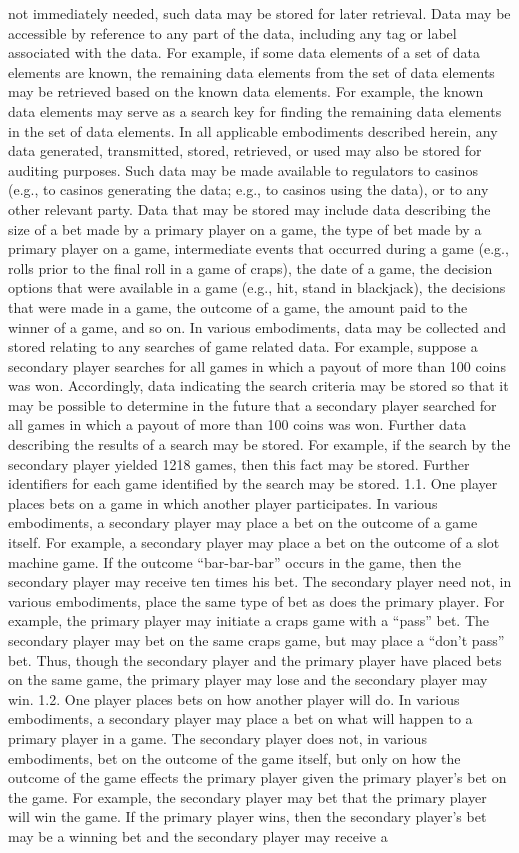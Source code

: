 \documentclass[11pt,a4paper]{article}
\begin{document}
not immediately needed, such data may be stored for later retrieval. Data may be accessible by reference to any part of the data, including any tag or label associated with the data. For example, if some data elements of a set of data elements are known, the remaining data elements from the set of data elements may be retrieved based on the known data elements. For example, the known data elements may serve as a search key for finding the remaining data elements in the set of data elements. In all applicable embodiments described herein, any data generated, transmitted, stored, retrieved, or used may also be stored for auditing purposes. Such data may be made available to regulators to casinos (e.g., to casinos generating the data; e.g., to casinos using the data), or to any other relevant party. Data that may be stored may include data describing the size of a bet made by a primary player on a game, the type of bet made by a primary player on a game, intermediate events that occurred during a game (e.g., rolls prior to the final roll in a game of craps), the date of a game, the decision options that were available in a game (e.g., hit, stand in blackjack), the decisions that were made in a game, the outcome of a game, the amount paid to the winner of a game, and so on. In various embodiments, data may be collected and stored relating to any searches of game related data. For example, suppose a secondary player searches for all games in which a payout of more than 100 coins was won. Accordingly, data indicating the search criteria may be stored so that it may be possible to determine in the future that a secondary player searched for all games in which a payout of more than 100 coins was won. Further data describing the results of a search may be stored. For example, if the search by the secondary player yielded 1218 games, then this fact may be stored. Further identifiers for each game identified by the search may be stored. 1.1. One player places bets on a game in which another player participates. In various embodiments, a secondary player may place a bet on the outcome of a game itself. For example, a secondary player may place a bet on the outcome of a slot machine game. If the outcome “bar-bar-bar” occurs in the game, then the secondary player may receive ten times his bet. The secondary player need not, in various embodiments, place the same type of bet as does the primary player. For example, the primary player may initiate a craps game with a “pass” bet. The secondary player may bet on the same craps game, but may place a “don't pass” bet. Thus, though the secondary player and the primary player have placed bets on the same game, the primary player may lose and the secondary player may win. 1.2. One player places bets on how another player will do. In various embodiments, a secondary player may place a bet on what will happen to a primary player in a game. The secondary player does not, in various embodiments, bet on the outcome of the game itself, but only on how the outcome of the game effects the primary player given the primary player's bet on the game. For example, the secondary player may bet that the primary player will win the game. If the primary player wins, then the secondary player's bet may be a winning bet and the secondary player may receive a 
\end{document}
